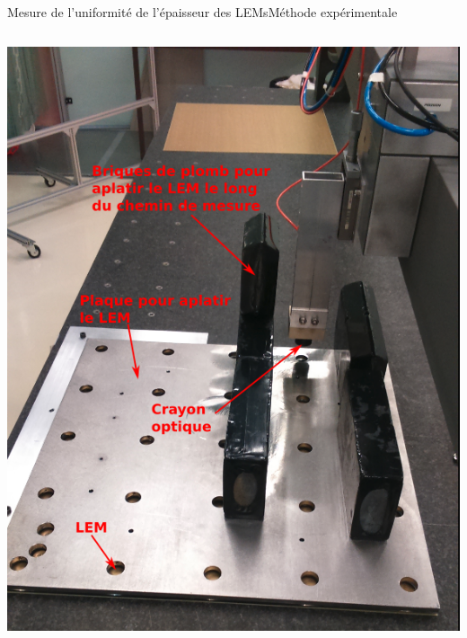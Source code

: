 \begin{frame}{Mesure de l'uniformité de l'épaisseur des LEMs}{Méthode expérimentale}
\begin{scriptsize}
\begin{columns}
\begin{column}{0.5\textwidth}
    				\centering \includegraphics[height=0.6\textheight]{./pictures/plate_and_bricks.png}\\
    			\end{column}
    		\end{columns}
    	\end{scriptsize}
    \end{frame}

